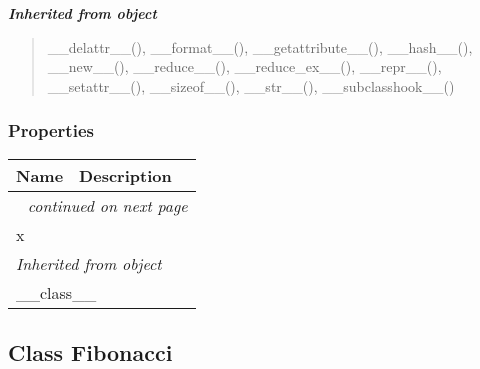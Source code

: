 \large{\textbf{\textit{Inherited from object}}}

\begin{quote}
\_\_delattr\_\_(), \_\_format\_\_(), \_\_getattribute\_\_(), \_\_hash\_\_(), \_\_new\_\_(), \_\_reduce\_\_(), \_\_reduce\_ex\_\_(), \_\_repr\_\_(), \_\_setattr\_\_(), \_\_sizeof\_\_(), \_\_str\_\_(), \_\_subclasshook\_\_()
\end{quote}


  \subsubsection{Properties}

    \vspace{-1cm}
\hspace{\varindent}\begin{longtable}{|p{\varnamewidth}|p{\vardescrwidth}|l}
\cline{1-2}
\cline{1-2} \centering \textbf{Name} & \centering \textbf{Description}& \\
\cline{1-2}
\endhead\cline{1-2}\multicolumn{3}{r}{\small\textit{continued on next page}}\\\endfoot\cline{1-2}
\endlastfoot\raggedright x\- & &\\
\cline{1-2}
\multicolumn{2}{|l|}{\textit{Inherited from object}}\\
\multicolumn{2}{|p{\varwidth}|}{\raggedright \_\_class\_\_}\\
\cline{1-2}
\end{longtable}



\subsection{Class Fibonacci}


